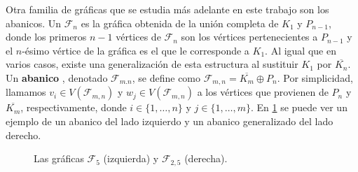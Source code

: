 Otra  familia de gr\'aficas que se estudia m\'as adelante en este trabajo son
los abanicos. Un  $\mathcal{F}_n$ es la gr\'afica obtenida de la
uni\'on completa de $K_1$ y $P_{n-1}$, donde los primeros $n-1$ v\'ertices de
$\mathcal{F}_n$ son los v\'ertices pertenecientes a $P_{n-1}$ y el $n$-\'esimo
v\'ertice de la gr\'afica es el que le corresponde a $K_1$. Al igual que en
varios casos, existe una generalizaci\'on de esta estructura al sustituir $K_1$
por $\overline{K_n}$. Un \textbf{abanico} ,
denotado $\mathcal{F}_{m.n}$, se define como $\mathcal{F}_{m,n}=\overline{K_m}
\oplus P_n$. Por simplicidad, llamamos $v_i \in V(\mathcal{F}_{m,n})$ y $w_j \in
V(\mathcal{F}_{m,n})$ a los v\'ertices que provienen de $P_n$ y
$\overline{K_m}$, respectivamente, donde $i \in \{1, \dots, n\}$ y $j \in \{1,
\dots, m\}$. En \cref{fig:ex-abanico} se puede ver un ejemplo de un abanico del
lado izquierdo y un abanico generalizado del lado derecho.

\begin{figure}[ht!]
    \centering
\caption{Las gr\'aficas $\mathcal{F}_5$ (izquierda) y $\mathcal{F}_{2,5}$
(derecha).}
\label{fig:ex-abanico}
\end{figure}

